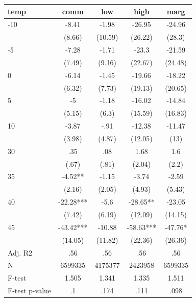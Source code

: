 \documentclass[]{article}
\begin{document}
\begin{tabular}{lcccc} \hline
temp & comm & low & high & marg \\ \hline
-10 & -8.41 & -1.98 & -26.95 & -24.96 \\
 & (8.66) & (10.59) & (26.22) & (28.3) \\
-5 & -7.28 & -1.71 & -23.3 & -21.59 \\
 & (7.49) & (9.16) & (22.67) & (24.48) \\
0 & -6.14 & -1.45 & -19.66 & -18.22 \\
 & (6.32) & (7.73) & (19.13) & (20.65) \\
5 & -5 & -1.18 & -16.02 & -14.84 \\
 & (5.15) & (6.3) & (15.59) & (16.83) \\
10 & -3.87 & -.91 & -12.38 & -11.47 \\
 & (3.98) & (4.87) & (12.05) & (13) \\
30 & .35 & .08 & 1.68 & 1.6 \\
 & (.67) & (.81) & (2.04) & (2.2) \\
35 & -4.52** & -1.15 & -3.74 & -2.59 \\
 & (2.16) & (2.05) & (4.93) & (5.43) \\
40 & -22.28*** & -5.6 & -28.65** & -23.05 \\
 & (7.42) & (6.19) & (12.09) & (14.15) \\
45 & -43.42*** & -10.88 & -58.63*** & -47.76* \\
 & (14.05) & (11.82) & (22.36) & (26.36) \\
\hline Adj. R2 & .56 & .56 & .56 & .56 \\
N & 6599335 & 4175377 & 2423958 & 6599335 \\
F-test & 1.505 & 1.341 & 1.335 & 1.511 \\
 F-test p-value & .1 & .174 & .111 & .098 \\ \hline
\end{tabular}
\end{document}
